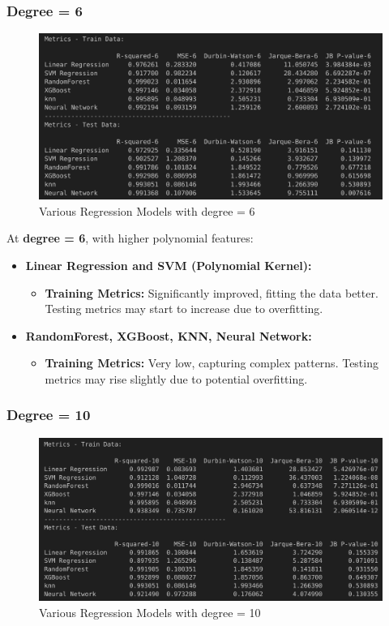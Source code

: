 \subsubsection*{Degree = 6}

\begin{figure}[H]
    \centering
    \includegraphics[width=0.8\linewidth]{./Images/Error-Metrics-Degree-6.png}
    \caption{Various Regression Models with degree = 6}
\end{figure}

At \textbf{degree = 6}, with higher polynomial features:

\begin{itemize}
    \item \textbf{Linear Regression and SVM (Polynomial Kernel):} 
    \begin{itemize}
        \item \textbf{Training Metrics:} Significantly improved, fitting the data better. Testing metrics may start to increase due to overfitting.
    \end{itemize}
    
    \item \textbf{RandomForest, XGBoost, KNN, Neural Network:}
    \begin{itemize}
        \item \textbf{Training Metrics:} Very low, capturing complex patterns. Testing metrics may rise slightly due to potential overfitting.
    \end{itemize}
\end{itemize}

\subsubsection*{Degree = 10}

\begin{figure}[H]
    \centering
    \includegraphics[width=0.8\linewidth]{./Images/Error-Metrics-Degree-10.png}
    \caption{Various Regression Models with degree = 10}
\end{figure}

